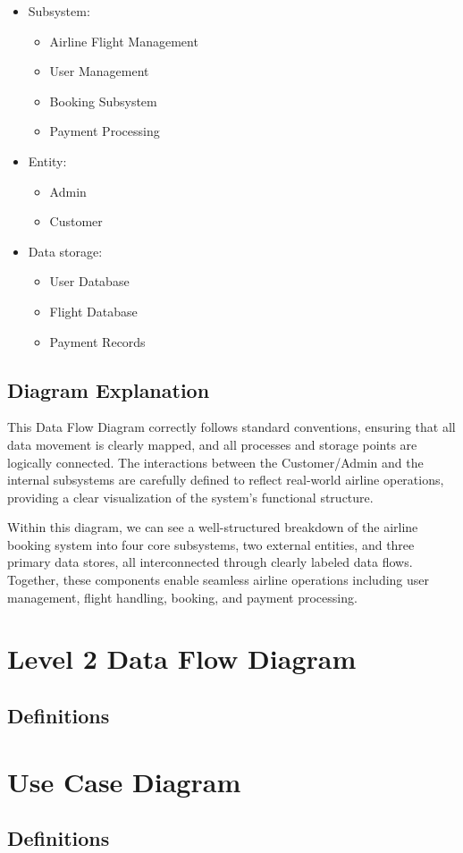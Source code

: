 \documentclass{article}
\begin{document}
\begin{itemize}
\item Subsystem: \begin{itemize}
    \item Airline Flight Management
    \item User Management
    \item Booking Subsystem
    \item Payment Processing
    \end{itemize}
\item Entity:
    \begin{itemize}
    \item Admin
    \item Customer
    \end{itemize}
\item Data storage:
    \begin{itemize}
    \item User Database
    \item Flight Database
    \item Payment Records
    \end{itemize}
\end{itemize}

\subsection{Diagram Explanation}

This Data Flow Diagram correctly follows standard conventions, ensuring that all data movement is clearly mapped, and all processes and storage points are logically connected. The interactions between the Customer/Admin and the internal subsystems are carefully defined to reflect real-world airline operations, providing a clear visualization of the system's functional structure.

Within this diagram, we can see a well-structured breakdown of the airline booking system into four core subsystems, two external entities, and three primary data stores, all interconnected through clearly labeled data flows. Together, these components enable seamless airline operations including user management, flight handling, booking, and payment processing.

\section{Level 2 Data Flow Diagram}

\subsection{Definitions}

\section{Use Case Diagram}

\subsection{Definitions}



\end{document}
